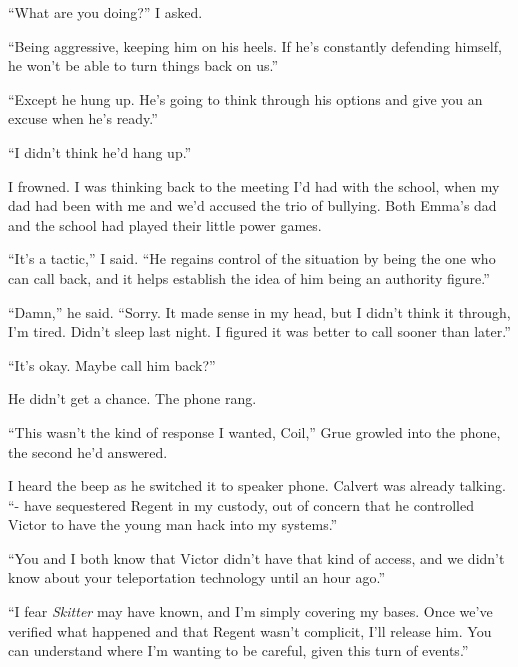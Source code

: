 ``What are you doing?'' I asked.



``Being aggressive, keeping him on his heels.  If he's constantly defending himself, he won't be able to turn things back on us.''



``Except he hung up.  He's going to think through his options and give you an excuse when he's ready.''



``I didn't think he'd hang up.''



I frowned.  I was thinking back to the meeting I'd had with the school, when my dad had been with me and we'd accused the trio of bullying.  Both Emma's dad and the school had played their little power games.



``It's a tactic,'' I said.  ``He regains control of the situation by being the one who can call back, and it helps establish the idea of him being an authority figure.''



``Damn,'' he said.  ``Sorry.  It made sense in my head, but I didn't think it through, I'm tired.  Didn't sleep last night.  I figured it was better to call sooner than later.''



``It's okay.  Maybe call him back?''



He didn't get a chance.  The phone rang.



``This wasn't the kind of response I wanted, Coil,'' Grue growled into the phone, the second he'd answered.



I heard the beep as he switched it to speaker phone.  Calvert was already talking.  ``- have sequestered Regent in my custody, out of concern that he controlled Victor to have the young man hack into my systems.''



``You and I both know that Victor didn't have that kind of access, and we didn't know about your teleportation technology until an hour ago.''



``I fear \emph{Skitter} may have known, and I'm simply covering my bases.  Once we've verified what happened and that Regent wasn't complicit, I'll release him.  You can understand where I'm wanting to be careful, given this turn of events.''




